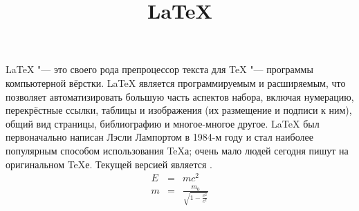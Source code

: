 \documentclass[12pt]{article}
\title{\LaTeX}
\date{}
\author{}
\begin{document}
  \LaTeX{} "--- это своего рода препроцессор текста для \TeX{} "---
  программы компьютерной вёрстки. \LaTeX{} является программируемым и
  расширяемым, что позволяет автоматизировать большую часть аспектов
  набора, включая нумерацию, перекрёстные ссылки, таблицы и изображения
  (их размещение и подписи к ним), общий вид страницы, библиографию и
  многое-многое другое. \LaTeX{} был первоначально написан Лэсли Лампортом
  в 1984-м году и стал наиболее популярным способом использования \TeX{}а;
  очень мало людей сегодня пишут на оригинальном \TeX{}е. Текущей
  версией является \LaTeXe.
  \newline
  \begin{eqnarray}
    E &=& mc^2\\
    m &=& \frac{m_0}{\sqrt{1-\frac{v^2}{c^2}}}
  \end{eqnarray}
\end{document}
